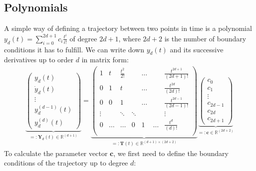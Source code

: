 \documentclass[a4paper,11pt,headings=standardclasses,parskip=half]{scrartcl}
\newcommand{\R}{\mathbb{R}} %
\begin{document}
\subsection{Polynomials} \label{sec:polynomials}
A simple way of defining a trajectory between two points in time is a polynomial $y_d(t)=\sum_{i=0}^{2d+1}c_i\frac{t^i}{i!}$ of degree $2d+1$, where $2d+2$ is the number of boundary conditions it has to fulfill. We can write down $y_d(t)$ and its successive derivatives up to order $d$ in  matrix form:
\begin{align}
\label{eq:1}
\underbrace{\begin{pmatrix}
y_d(t) \\ \dot{y}_d(t) \\ \vdots \\ y_d^{(d-1)}(t) \\ y_d^{(d)}(t)
\end{pmatrix}}_{=:\mathbf{Y}_d(t) \in \R^{(d+1)}}
=\underbrace{\begin{pmatrix}
1 &t & \frac{t^2}{2!}&         &  \hdots         &  & \frac{t^{2d+1}}{(2d+1)!} \\
0 &1   & t             &         &  \hdots         &  & \frac{t^{2d}}{(2d)!} \\
0 &0   & 1               &         & \hdots          &  &  \frac{t^{2d-1}}{(2d-1)!} \\
\vdots &                 &  \ddots & \ddots &  &   &  \vdots \\
0      &\hdots           & \hdots       & 0 & 1& \hdots & \frac{t^{d}}{(d)!} \\
\end{pmatrix}}_{=:\mathbf{T}(t)\in \R^{(d+1)\times (2d+2)}}
\underbrace{
\begin{pmatrix}
c_0 \\ c_1 \\ \vdots \\ c_{2d-1}\\ c_{2d}\\ c_{2d+1} 
\end{pmatrix}}_{=:\mathbf{c}\in \R^{(2d+2)}}
\end{align}
To calculate the parameter vector $\mathbf{c}$, we first need to define the boundary conditions of the trajectory up to degree $d$:
\end{document}

